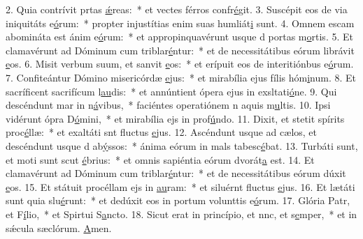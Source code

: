 2. Quia contrívit prtas \uline{ǽ}reas:~* et vectes férros confr\uline{é}git.
3. Suscépit eos de via iniquitáts e\uline{ó}rum:~* propter injustítias enim suas humliát\uline{i} sunt.
4. Omnem escam abomináta est ánim e\uline{ó}rum:~* et appropinquavérunt usque d portas m\uline{o}rtis.
5. Et clamavérunt ad Dóminum cum triblar\uline{é}ntur:~* et de necessitátibus eórum librávit \uline{e}os.
6. Misit verbum suum, et sanvit \uline{e}os:~* et erípuit eos de interitiónbus e\uline{ó}rum.
7. Confiteántur Dómino misericórdæ \uline{e}jus:~* et mirabília ejus fílis hóm\uline{i}num.
8. Et sacríficent sacrifícum l\uline{au}dis:~* et annúntient ópera ejus in exsltati\uline{ó}ne.
9. Qui descéndunt mar in n\uline{á}vibus,~* faciéntes operatiónem n aquis m\uline{u}ltis.
10. Ipsi vidérunt ópra D\uline{ó}mini,~* et mirabília ejs in prof\uline{ú}ndo.
11. Dixit, et stetit spírits proc\uline{é}llæ:~* et exaltáti snt fluctus \uline{e}jus.
12. Ascéndunt usque ad cælos, et descéndunt usque d ab\uline{ý}ssos:~* ánima eórum in mals tabesc\uline{é}bat.
13. Turbáti sunt, et moti sunt scut \uline{é}brius:~* et omnis sapiéntia eórum dvorát\uline{a} est.
14. Et clamavérunt ad Dóminum cum triblar\uline{é}ntur:~* et de necessitátibus eórum dúxit \uline{e}os.
15. Et státuit procéllam ejs in \uline{au}ram:~* et siluérnt fluctus \uline{e}jus.
16. Et lætáti sunt quia slu\uline{é}runt:~* et dedúxit eos in portum volunttis e\uline{ó}rum.
17. Glória Patr, et F\uline{í}lio,~* et Spirtui S\uline{a}ncto.
18. Sicut erat in princípio, et nnc, et s\uline{e}mper,~* et in sǽcula sæclórum. \uline{A}men.
